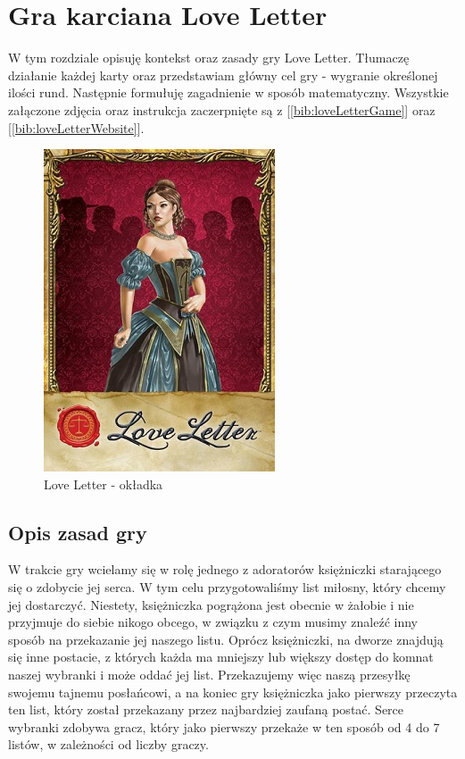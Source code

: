 \chapter{Gra karciana Love Letter}
\label{cha:rozdz2}

W tym rozdziale opisuję kontekst oraz zasady gry Love Letter. Tłumaczę działanie każdej karty oraz przedstawiam główny cel gry - wygranie określonej ilości rund. Następnie formułuję zagadnienie w sposób matematyczny. Wszystkie załączone zdjęcia oraz instrukcja zaczerpnięte są z [\ref{bib:loveLetterGame}] oraz [\ref{bib:loveLetterWebsite}].

\begin{figure}[h]
	\centering
	\includegraphics{Resources/ll_main_image.png}
	\caption{Love Letter - okładka} 
	\label{fig:llMainImage}
\end{figure}

\section{Opis zasad gry}
\label{sec:opisGry}
W trakcie gry wcielamy się w rolę jednego z adoratorów księżniczki starającego się o zdobycie jej serca. W tym celu przygotowaliśmy list miłosny, który chcemy jej dostarczyć. Niestety, księżniczka pogrążona jest obecnie w żałobie i nie przyjmuje do siebie nikogo obcego, w związku z czym musimy znaleźć inny sposób na przekazanie jej naszego listu. Oprócz księżniczki, na dworze znajdują się inne postacie, z których każda ma mniejszy lub większy dostęp do komnat naszej wybranki i może oddać jej list. Przekazujemy więc naszą przesyłkę swojemu tajnemu posłańcowi, a na koniec gry księżniczka jako pierwszy przeczyta ten list, który został przekazany przez najbardziej zaufaną postać. Serce wybranki zdobywa gracz, który jako pierwszy przekaże w ten sposób od 4 do 7 listów, w zależności od liczby graczy.

